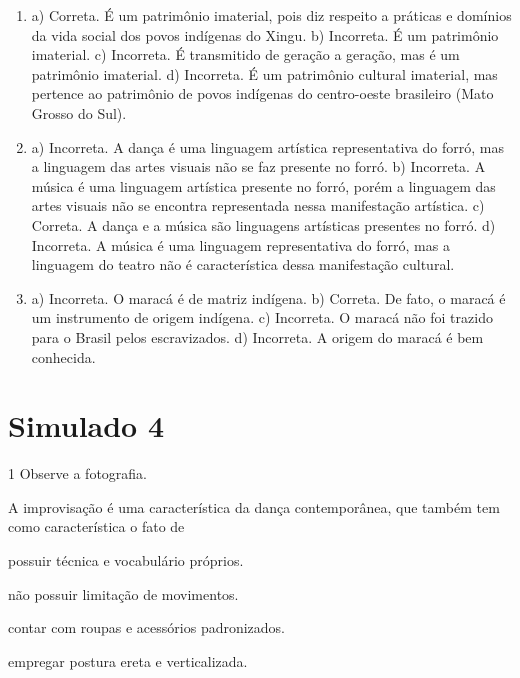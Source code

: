\begin{enumerate}
\item
a) Correta. É um patrimônio imaterial, pois diz respeito a práticas e
domínios da vida social dos povos indígenas do Xingu.
b) Incorreta. É um patrimônio imaterial.
c) Incorreta. É transmitido de geração a geração, mas é um patrimônio
imaterial.
d) Incorreta. É um patrimônio cultural imaterial, mas pertence ao
patrimônio de povos indígenas do centro-oeste brasileiro (Mato Grosso do
Sul).

\item
a) Incorreta. A dança é uma linguagem artística representativa do forró,
mas a linguagem das artes visuais não se faz presente no forró.
b) Incorreta. A música é uma linguagem artística presente no forró,
porém a linguagem das artes visuais não se encontra representada nessa
manifestação artística.
c) Correta. A dança e a música são linguagens artísticas presentes no
forró.
d) Incorreta. A música é uma linguagem representativa do forró, mas a
linguagem do teatro não é característica dessa manifestação cultural.

\item
a) Incorreta. O maracá é de matriz indígena.
b) Correta. De fato, o maracá é um instrumento de origem indígena.
c) Incorreta. O maracá não foi trazido para o Brasil pelos escravizados.
d) Incorreta. A origem do maracá é bem conhecida.
\end{enumerate}

\chapter{Simulado 4}

\num{1}  Observe a fotografia.


A improvisação é uma característica da dança contemporânea, que também tem como característica o fato de

\begin{minipage}{.5\textwidth}
\begin{escolha}
\item
  possuir técnica e vocabulário próprios.
\item
  não possuir limitação de movimentos.
\item
  contar com roupas e acessórios padronizados.
\item
  empregar postura ereta e verticalizada.
\end{escolha}
\end{minipage}

